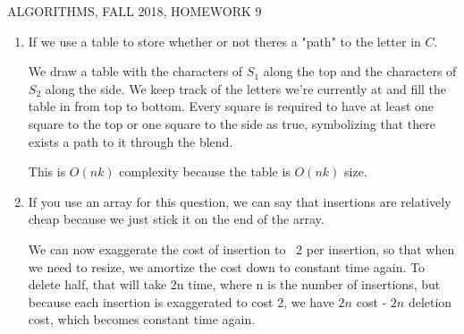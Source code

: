 \documentclass[12pt]{article}
\begin{document}
  
\pagestyle{empty}
 

\begin{center} ALGORITHMS,   FALL 2018, HOMEWORK 9
\end{center}

\begin{enumerate}

 \item If we use a table to store whether or not theres a "path" to the letter in $C$. 

 We draw a table with the characters of $S_1$ along the top and the characters of $S_2$ along the side. We keep track of the letters we're currently at 
and fill the table in from top to bottom. Every square is required to have at least one square to the top or one square to the side as true, symbolizing
that there exists a path to it through the blend.

This is $O(nk)$ complexity because the table is $O(nk)$ size.

\pagebreak

\item If you use an array for this question, we can say that insertions are relatively cheap because we just stick it on the end of the array.

We can now exaggerate the cost of insertion to ~2 per insertion, so that when we need to resize, we amortize the cost down to constant time again.
To delete half, that will take 2n time, where n is the number of insertions, but because each insertion is exaggerated to cost 2, we have 
$2n$ cost - $2n$ deletion cost, which becomes constant time again.


\end{enumerate}
\end{document}
